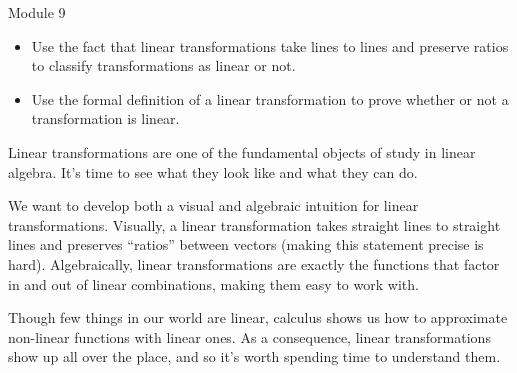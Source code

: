 \documentclass{workbook}
\begin{document}
\begin{lesson}

	Module 9

	\begin{itemize}
		\item Use the fact that linear transformations take lines to lines and preserve
			ratios to classify transformations as linear or not.
		\item Use the formal definition of a linear transformation to prove whether or not a
			transformation is linear.
	\end{itemize}

		Linear transformations are one of the fundamental objects of study in linear algebra.
		It's time to see what they look like and what they can do.

		We want to develop both a visual and algebraic intuition for linear transformations.
		Visually, a linear transformation takes straight lines to straight lines and preserves ``ratios'' between
		vectors (making this statement precise is hard). Algebraically, linear transformations are exactly
		the functions that factor in and out of linear combinations, making them easy to work with.

		Though few things in our world are linear, calculus shows us how to approximate
		non-linear functions with linear ones. As a consequence, linear transformations show
		up all over the place, and so it's worth spending time to understand them.
\end{lesson}
\end{document}
